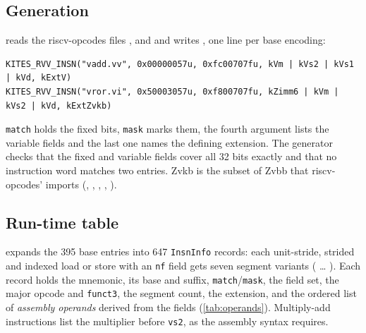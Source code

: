 \documentclass[11pt]{article}
\begin{document}
\subsection{Generation}
 reads the riscv-opcodes files , 
and  and writes , one line per base
encoding:

\begin{lstlisting}[basicstyle=\ttfamily\scriptsize]
KITES_RVV_INSN("vadd.vv", 0x00000057u, 0xfc00707fu, kVm | kVs2 | kVs1 | kVd, kExtV)
KITES_RVV_INSN("vror.vi", 0x50003057u, 0xf800707fu, kZimm6 | kVm | kVs2 | kVd, kExtZvkb)
\end{lstlisting}

\texttt{match} holds the fixed bits, \texttt{mask} marks them, the fourth argument lists the
variable fields and the last one names the defining extension. The generator checks that the
fixed and variable fields cover all 32 bits exactly and that no instruction word matches two
entries. Zvkb is the subset of Zvbb that riscv-opcodes'  imports
(, , , , ).

\subsection{Run-time table}
 expands the 395 base entries into 647 \texttt{InsnInfo} records: each
unit-stride, strided and indexed load or store with an \texttt{nf} field gets seven segment
variants ( \ldots{} ). Each record holds the mnemonic, its base
and suffix, \texttt{match}/\texttt{mask}, the field set, the major opcode and \texttt{funct3}, the
segment count, the extension, and the ordered list of \emph{assembly operands} derived from the
fields (\cref{tab:operands}). Multiply-add instructions list the multiplier before \texttt{vs2},
as the assembly syntax requires.
\end{document}

